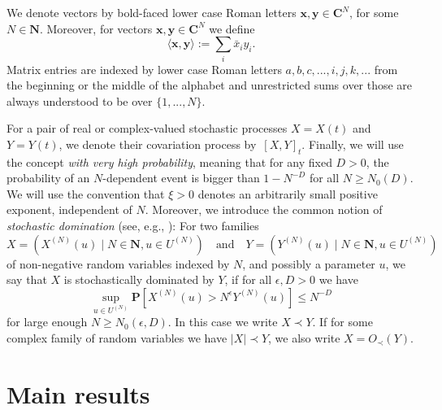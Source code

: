 \documentclass[10pt]{amsart}
\numberwithin{equation}{section}
\newcommand{\C}{\mathbf{C}}
\newcommand{\N}{\mathbf{N}}
\begin{document}
We denote vectors by bold-faced lower case Roman letters $\boldsymbol{x}, \boldsymbol{y} \in \C^{N}$, for some $N \in \N$. Moreover, for vectors $\boldsymbol{x}, \boldsymbol{y} \in \C^{N}$ we define
 \begin{equation*}
	\langle \boldsymbol{x}, \boldsymbol{y} \rangle := \sum_i \bar{x}_i y_i. 
\end{equation*}
Matrix entries are indexed by lower case Roman letters $a, b, c , ... ,i,j,k,... $ from the beginning or the middle of the alphabet and unrestricted sums over those are always understood to be over $\{ 1 , ... , N\}$. 

For a pair of real or complex-valued stochastic processes $X=X(t)$ and $Y=Y(t)$, we denote their covariation process by~$[X,Y]_t$. Finally, we will use the concept  \emph{with very high probability},  meaning that for any fixed $D > 0$, the probability of an $N$-dependent event is bigger than $1 - N^{-D}$ for all $N \ge N_0(D)$. We will use the convention that $\xi > 0$ denotes an arbitrarily small positive exponent, independent of $N$.
 Moreover, we introduce the common notion of \emph{stochastic domination} (see, e.g., \cite{loc_sc_gen}): For two families
\begin{equation*}
	X = \left(X^{(N)}(u) \mid N \in \N, u \in U^{(N)}\right) \quad \text{and} \quad Y = \left(Y^{(N)}(u) \mid N \in \N, u \in U^{(N)}\right)
\end{equation*}
of non-negative random variables indexed by $N$, and possibly a parameter $u$, we say that $X$ is stochastically dominated by $Y$, if for all $\epsilon, D >0$ we have 
\begin{equation*}
	\sup_{u \in U^{(N)}} \mathbf{P} \left[X^{(N)}(u) > N^\epsilon Y^{(N)}(u)\right] \le N^{-D}
\end{equation*}
for large enough $N \ge N_0(\epsilon, D)$. In this case we write $X \prec Y$. If for some complex family of random variables we have $\vert X \vert \prec Y$, we also write $X = O_\prec(Y)$.


\section{Main results}
\end{document}
